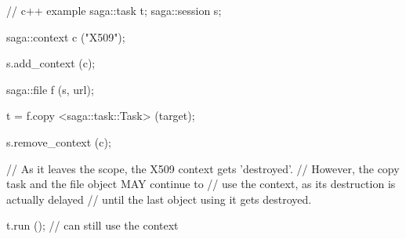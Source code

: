  \begin{mycode}
  // c++ example
  saga::task    t;
  saga::session s;
 
  {
    saga::context c ("X509");
 
    s.add_context (c);
 
    saga::file f (s, url);
 
    t = f.copy <saga::task::Task> (target);
 
    s.remove_context (c);
  }
 
  // As it leaves the scope, the X509 context gets 'destroyed'.
  // However, the copy task and the file object MAY continue to
  // use the context, as its destruction is actually delayed
  // until the last object using it gets destroyed.
 
  t.run (); // can still use the context
 \end{mycode}
 

